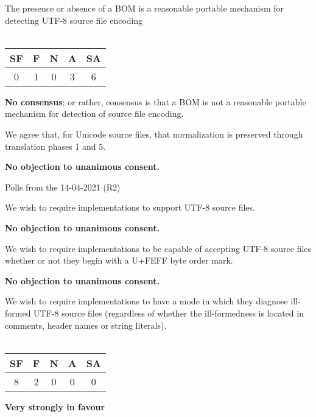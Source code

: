 \documentclass{wg21}
\begin{document}
\begin{quoteblock}
The presence or absence of a BOM is a reasonable portable mechanism
for detecting UTF-8 source file encoding
\\\\
\begin{tabular}{|c|c|c|c|c|}
\hline
SF & F & N & A & SA \\
\hline
0 & 1 & 0 & 3 & 6 \\
\hline
\end{tabular}

\textbf{No consensus};  or rather,
consensus is that a BOM is not a reasonable portable mechanism for detection of source file encoding.
\end{quoteblock}

\begin{quoteblock}
We agree that, for Unicode source files, that normalization is preserved through translation phases 1 and 5.

\textbf{No objection to unanimous consent.}
\end{quoteblock}

Polls from the 14-04-2021 (R2)

\begin{quoteblock}
We wish to require implementations to support UTF-8 source files.

\textbf{No objection to unanimous consent.}
\end{quoteblock}


\begin{quoteblock}
We wish to require implementations to be capable of accepting UTF-8
source files whether or not they begin with a U+FEFF byte order mark.

\textbf{No objection to unanimous consent.}
\end{quoteblock}

\begin{quoteblock}
We wish to require implementations to have a mode in which they diagnose
ill-formed UTF-8 source files (regardless of whether the ill-formedness is
located in comments, header names or string literals).
\\\\
\begin{tabular}{|c|c|c|c|c|}
    \hline
    SF & F & N & A & SA \\
    \hline
    8 & 2 & 0 & 0 & 0 \\
    \hline
\end{tabular}

\textbf{Very strongly in favour}
\end{quoteblock}
\end{document}
